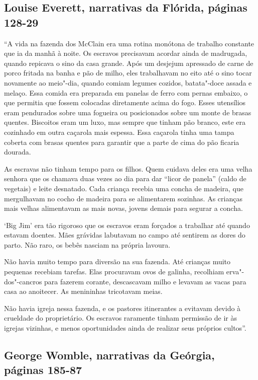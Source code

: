 \subsection{Louise Everett, narrativas da Flórida, páginas 128-29}

``A vida na fazenda dos McClain era uma rotina monótona de trabalho
constante que ia da manhã à noite. Os escravos precisavam acordar ainda
de madrugada, quando repicava o sino da casa grande. Após um desjejum
apressado de carne de porco fritada na banha e pão de milho, eles
trabalhavam no eito até o sino tocar novamente ao meio"-dia, quando
comiam legumes cozidos, batata"-doce assada e melaço. Essa comida era
preparada em panelas de ferro com pernas embaixo, o que permitia que
fossem colocadas diretamente acima do fogo. Esses utensílios eram
pendurados sobre uma fogueira ou posicionados sobre um monte de brasas
quentes. Biscoitos eram um luxo, mas sempre que tinham pão branco, este
era cozinhado em outra caçarola mais espessa. Essa caçarola tinha uma
tampa coberta com brasas quentes para garantir que a parte de cima do
pão ficaria dourada.

As escravas não tinham tempo para os filhos. Quem cuidava deles era uma
velha senhora que os chamava duas vezes ao dia para dar ``licor de
panela'' (caldo de vegetais) e leite desnatado. Cada criança recebia uma
concha de madeira, que mergulhavam no cocho de madeira para se
alimentarem sozinhas. As crianças mais velhas alimentavam as mais novas,
jovens demais para segurar a concha.

`Big Jim' era tão rigoroso que os escravos eram forçados a trabalhar até
quando estavam doentes. Mães grávidas labutavam no campo até sentirem as
dores do parto. Não raro, os bebês nasciam na própria lavoura.

Não havia muito tempo para diversão na sua fazenda. Até crianças muito
pequenas recebiam tarefas. Elas procuravam ovos de galinha, recolhiam
erva"-dos"-cancros para fazerem corante, descascavam milho e levavam as
vacas para casa ao anoitecer. As menininhas tricotavam meias.

Não havia igreja nessa fazenda, e os pastores itinerantes a evitavam
devido à crueldade do proprietário. Os escravos raramente tinham
permissão de ir às igrejas vizinhas, e menos oportunidades ainda de
realizar seus próprios cultos''.

\subsection{George Womble, narrativas da Geórgia, páginas 185-87}
\label{ref307}

